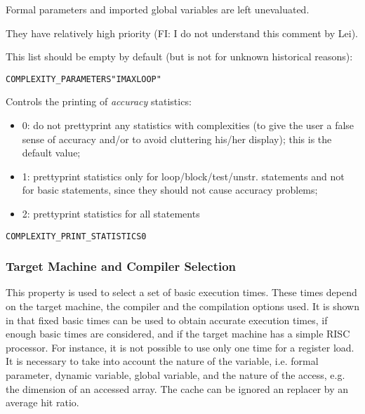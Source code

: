 \documentclass[a4paper]{report}
\newenvironment{PipsProp}{\begin{alltt}}{\end{alltt}}
\begin{document}
Formal parameters and imported global variables are left unevaluated.

They have relatively high priority (FI: I do not understand this comment
by Lei).

This list should be empty by default (but is not for unknown historical
reasons):

\begin{PipsProp}
COMPLEXITY_PARAMETERS "IMAX LOOP"
\end{PipsProp}

Controls the printing of {\em accuracy} statistics:

\begin{itemize}

  \item 0: do not prettyprint any statistics with complexities (to give
the user a false sense of accuracy and/or to avoid cluttering his/her
display); this is the default value;

  \item 1: prettyprint statistics only for loop/block/test/unstr.
statements and not for basic statements, since they should not cause
accuracy problems;

  \item 2: prettyprint statistics for all statements

\end{itemize}

\begin{PipsProp}
COMPLEXITY_PRINT_STATISTICS 0
\end{PipsProp}

\subsubsection{Target Machine and Compiler Selection}

This property is used to select a set of basic execution times. These
times depend on the target machine, the compiler and the compilation
options used. It is shown in \cite{Z94} that fixed basic times can be
used to obtain accurate execution times, if enough basic times are
considered, and if the target machine has a simple RISC processor. For
instance, it is not possible to use only one time for a register
load. It is necessary to take into account the nature of the variable,
i.e. formal parameter, dynamic variable, global variable, and the nature
of the access, e.g. the dimension of an accessed array. The cache can be
ignored an replacer by an average hit ratio.
\end{document}
